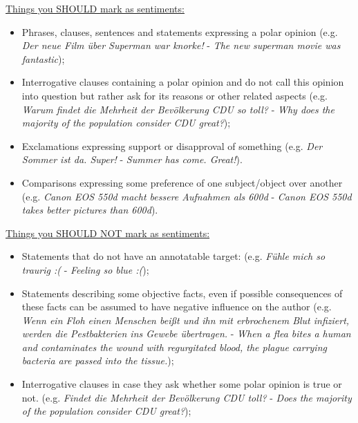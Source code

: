 \documentclass[11pt,a4paper]{article}
\begin{document}
\underline{Things you SHOULD mark as sentiments:}
\begin{itemize}
  \item Phrases, clauses, sentences and statements expressing a polar opinion
    (e.g. \textit{Der neue Film \"uber Superman war knorke!} -
    \textit{The new superman movie was fantastic});
  \item Interrogative clauses containing a polar opinion
    and do not call this opinion into question but rather ask for its
    reasons or other related aspects (e.g. \textit{Warum findet die
      Mehrheit der Bev\"olkerung CDU so toll?} - \textit{Why does the
      majority of the population consider CDU great?});
  \item Exclamations expressing support or disapproval of
    something (e.g. \textit{Der Sommer ist da. Super!} -
    \textit{Summer has come. Great!}).
  \item Comparisons expressing some preference of one subject/object over another 
      (e.g. \textit{Canon EOS 550d macht bessere Aufnahmen als 600d} - \textit{Canon EOS 550d takes
      better pictures than 600d}).
\end{itemize}


\underline{Things you SHOULD NOT mark as sentiments:}
\begin{itemize}
  \item Statements that do not have an annotatable target:
      (e.g. \textit{F\"uhle mich so traurig :(} - \textit{Feeling so blue :(});
  \item Statements describing some objective facts, even if possible
    consequences of these facts can be assumed to have negative
    influence on the author (e.g. \textit{Wenn ein Floh einen Menschen
      bei\ss{}t und ihn mit erbrochenem Blut infiziert, werden die
      Pestbakterien ins Gewebe \"ubertragen.} - \textit{When a flea
      bites a human and contaminates the wound with regurgitated
      blood, the plague carrying bacteria are passed into the
      tissue.});
  \item Interrogative clauses in case they ask whether some polar
    opinion is true or not. (e.g. \textit{Findet die Mehrheit
      der Bev\"olkerung CDU toll?} - \textit{Does the majority
      of the population consider CDU great?});
\end{itemize}

\end{document}
